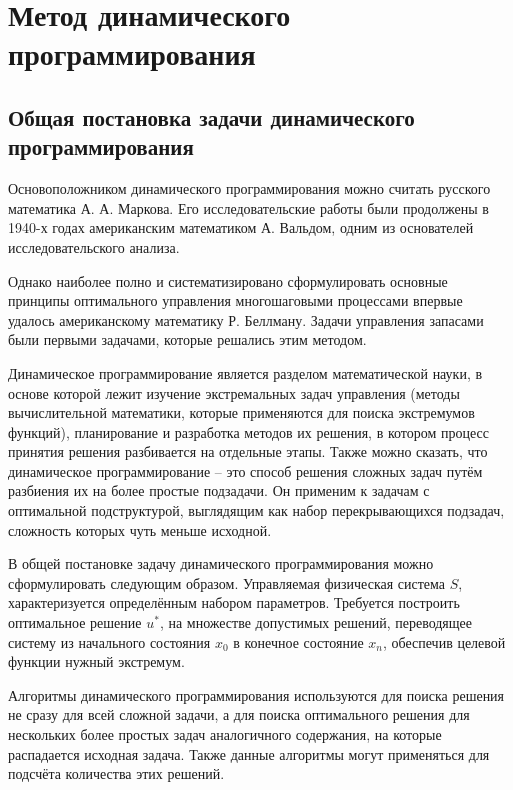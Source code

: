 \setlength{\abovedisplayskip}{1.5mm}
\setlength{\belowdisplayskip}{1.5mm}


\section{Метод динамического программирования}

\subsection{Общая постановка задачи динамического программирования}

\indent Основоположником динамического программирования можно считать русского математика А. А. Маркова. Его исследовательские работы были продолжены в 1940-х годах американским математиком А. Вальдом, одним из основателей исследовательского анализа.

Однако наиболее полно и систематизировано сформулировать основные принципы оптимального управления многошаговыми процессами впервые удалось американскому математику Р. Беллману. Задачи управления запасами были первыми задачами, которые решались этим методом.

Динамическое программирование является разделом математической науки, в основе которой лежит изучение экстремальных задач управления (методы вычислительной математики, которые применяются для поиска экстремумов функций), планирование и разработка методов их решения, в котором процесс принятия решения разбивается на отдельные этапы. Также можно сказать, что динамическое программирование -- это способ решения сложных задач путём разбиения их на более простые подзадачи. Он применим к задачам с оптимальной подструктурой, выглядящим как набор перекрывающихся подзадач, сложность которых чуть меньше исходной.

В общей постановке задачу динамического программирования можно сформулировать следующим образом. Управляемая физическая система $S$, характеризуется определённым набором параметров. Требуется построить оптимальное решение $u^*$, на множестве допустимых решений, переводящее систему из начального состояния $x_0$ в конечное состояние $x_n$, обеспечив целевой функции нужный экстремум.

Алгоритмы динамического программирования используются для поиска решения не сразу для всей сложной задачи, а для поиска оптимального решения для нескольких более простых задач аналогичного содержания, на которые распадается исходная задача. Также данные алгоритмы могут применяться для подсчёта количества этих решений.

